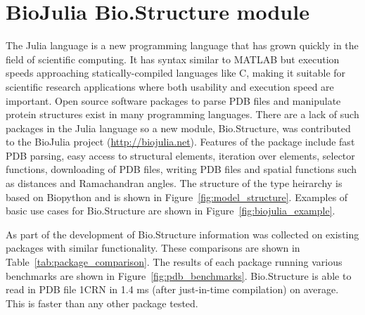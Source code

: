 \section{BioJulia Bio.Structure module}
\label{sec:appendices_biojulia}

The Julia language \cite{Bezanson2017} is a new programming language that has grown quickly in the field of scientific computing.
It has syntax similar to MATLAB but execution speeds approaching statically-compiled languages like C, making it suitable for scientific research applications where both usability and execution speed are important.
Open source software packages to parse PDB files and manipulate protein structures exist in many programming languages.
There are a lack of such packages in the Julia language so a new module, Bio.Structure, was contributed to the BioJulia project (\url{http://biojulia.net}).
Features of the package include fast PDB parsing, easy access to structural elements, iteration over elements, selector functions, downloading of PDB files, writing PDB files and spatial functions such as distances and Ramachandran angles.
The structure of the type heirarchy is based on Biopython \cite{Cock2009} and is shown in Figure~\ref{fig:model_structure}.
Examples of basic use cases for Bio.Structure are shown in Figure~\ref{fig:biojulia_example}.

As part of the development of Bio.Structure information was collected on existing packages with similar functionality.
These comparisons are shown in Table~\ref{tab:package_comparison}.
The results of each package running various benchmarks are shown in Figure~\ref{fig:pdb_benchmarks}.
Bio.Structure is able to read in PDB file 1CRN in 1.4 ms (after just-in-time compilation) on average.
This is faster than any other package tested.


